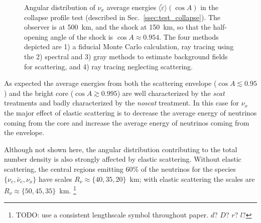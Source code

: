 \documentclass[aps,floatfix,prd,superscriptaddress,twocolumn]{revtex4-1}
\begin{document}
\begin{figure}
  \resizebox{\columnwidth}{!}{}
  \caption{Angular distribution of $\nu_x$ average energies
    $\langle\tilde{\varepsilon}\rangle(\cos A)$
    in the collapse profile test (described in Sec.~\ref{ssec:test_collapse}).
    The observer is at 500~km, and the shock at 150~km,
    so that the half-opening angle of the shock is $\cos A\approx0.954$.
    The four methods depicted are 1) a fiducial Monte Carlo calculation,
    ray tracing using the 2) spectral and 3) gray methods to estimate background
    fields for scattering, and 4) ray tracing neglecting scattering.
  }
  \label{fig:avg_eps_collapse}
\end{figure}

As expected the average energies from both
the scattering envelope ($\cos A \lesssim 0.95$) and
the bright core ($\cos A\gtrsim 0.995 $)
are well characterized by the \emph{scat} treatments
and badly characterized by the \emph{noscat} treatment.
In this case for $\nu_x$ the major effect of elastic scattering
is to decrease the average energy of neutrinos coming from the core
and increase the average energy of neutrinos coming from the envelope.

Although not shown here, the angular distribution contributing to the
total number density is also strongly affected by elastic scattering.
Without elastic scattering, the central regions emitting 60\%
of the neutrinos for the species $\{\nu_e,\bar{\nu}_e,\nu_x\}$
have scales $R_\nu\approx\{40,35,20\}$~km;
with elastic scattering the scales are
$R_\nu\approx\{50,45,35\}$~km.
\footnote{TODO: use a consistent lengthscale symbol throughout paper. $d$? $D$? $r$? $l$?}
\end{document}

